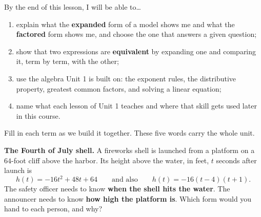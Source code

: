 \documentclass[10pt]{article}
\begin{document}

\vspace{0.15in}

\begin{objectivebox}
\small
By the end of this lesson, I will be able to\dots
\begin{enumerate}[leftmargin=1.5em, itemsep=2pt, topsep=3pt]
  \item explain what the \textbf{expanded} form of a model shows me and what the
        \textbf{factored} form shows me, and choose the one that answers a given question;
  \item show that two expressions are \textbf{equivalent} by expanding one and comparing it,
        term by term, with the other;
  \item use the algebra Unit 1 is built on: the exponent rules, the distributive property,
        greatest common factors, and solving a linear equation;
  \item name what each lesson of Unit 1 teaches and where that skill gets used later in this
        course.
\end{enumerate}
\end{objectivebox}

\vspace{0.10in}

\boxguard
\begin{vocabbox}
\small
Fill in each term as we build it together. These five words carry the whole unit.
\end{vocabbox}

\vspace{0.10in}

\boxguard
\begin{hookbox}
\small
\textbf{The Fourth of July shell.} A fireworks shell is launched from a platform on a $64$-foot
cliff above the harbor. Its height above the water, in feet, $t$ seconds after launch is
\[ h(t) = -16t^2+48t+64 \qquad\text{and also}\qquad h(t) = -16(t-4)(t+1). \]
The safety officer needs to know \textbf{when the shell hits the water}. The announcer needs to
know \textbf{how high the platform is}. Which form would you hand to each person, and why?

\end{hookbox}
\end{document}
